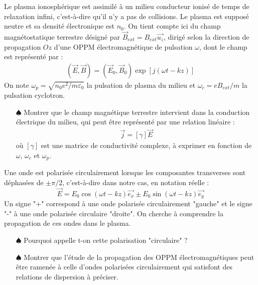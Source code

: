 \documentclass{report}
\begin{document}
Le plasma ionosphérique est assimilé à un milieu conducteur ionisé de temps de relaxation infini, c'est-à-dire qu'il n'y a pas de collisions. Le plasma est supposé neutre et sa densité électronique est $n_0$. On tient compte ici du champ magnétostatique terrestre désigné par $\vec{B}_{ext}=B_{ext}\vec{u_z}$, dirigé selon la direction de propagation $Oz$ d'une OPPM électromagnétique de pulsation $\omega$, dont le champ est représenté par :
\begin{align*}
	(\vec{E},\vec{B})=(\vec{E}_0,\vec{B}_0)\exp[j(\omega t-kz)]
\end{align*}
On note $\omega_p=\sqrt{n_0e^2/m\varepsilon_0}$ la pulsation de plasma du milieu et $\omega_c=eB_{ext}/m$ la pulsation cyclotron. 

\begin{itemize}
	
	\item[$\spadesuit$] Montrer que le champ magnétique terrestre intervient dans la conduction électrique du milieu, qui peut être représenté par une relation linéaire :
	\begin{align*}
		\vec{j}=\left[\gamma \right] \vec{E}
	\end{align*}
	où $\left[\gamma \right]$ est une matrice de conductivité complexe, à exprimer en fonction de $\omega$, $\omega_c$ et $\omega_p$.
	
\end{itemize}

Une onde est polarisée circulairement lorsque les composantes transverses sont déphasées de $\pm\pi/2$, c'est-à-dire dans notre cas, en notation réelle :
\begin{equation}
	\vec{E}=E_0\cos(\omega t - kz)\vec{e_x}\pm E_0\sin(\omega t - kz)\vec{e_y}
\end{equation}
Un signe "+" correspond à une onde polarisée circulairement "gauche" et le signe "-" à une onde polarisée circulaire "droite". On cherche à comprendre la propagation de ces ondes dans le plasma.

\begin{itemize}

	\item[$\spadesuit$] Pourquoi appelle t-on cette polarisation "circulaire" ? 
	
	\item[$\spadesuit$] Montrer que l'étude de la propagation des OPPM électromagnétiques peut être ramenée à celle d'ondes polarisées circulairement qui satisfont des relations de dispersion à préciser. 
	
\end{itemize}
\end{document}
